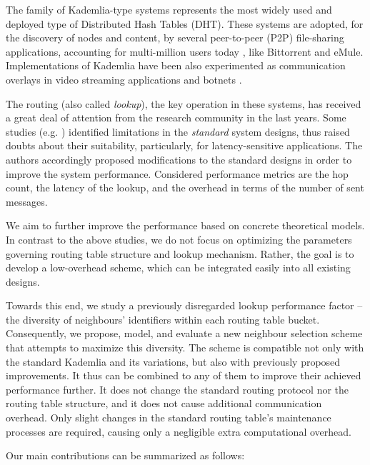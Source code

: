 \documentclass[10pt, conference, compsocconf, letterpaper]{IEEEtran}
\begin{document}
The family of Kademlia-type \cite{Maymounkov02Kademlia} systems represents the most widely used and deployed type of Distributed Hash Tables (DHT). These systems are adopted, for the discovery of nodes and content, by several peer-to-peer (P2P) file-sharing applications, accounting for multi-million users today \cite{wang2013measuring, salah13capturing}, like Bittorrent and eMule. Implementations of Kademlia have been also experimented as communication overlays in video streaming applications \cite{jimenez11kademlia} and botnets \cite{starnberger08overbot, holz08measurements}.

The routing (also called \emph{lookup}), the key operation in these systems, has received a great deal of attention from the research community in the last years. Some studies (e.g. \cite{li05comparing, stutzbach06improving, steiner10evaluating, falkner07profiling, crosby07analysis, Jimenez2011subsecond, roos13comprehending}) identified limitations in the \emph{standard} system designs, thus raised doubts about their suitability, particularly, for latency-sensitive applications. 
The authors accordingly proposed modifications to the standard designs in order to improve the system performance. 
Considered performance metrics are the hop count, the latency of the lookup, and the overhead in terms of the number of sent messages.

We aim to further improve the performance based on concrete theoretical models. 
In contrast to the above studies, we do not focus on optimizing the parameters governing routing table structure and lookup mechanism. Rather, the goal is to develop a low-overhead scheme, which can be integrated easily into all existing designs. 

Towards this end, we study a previously disregarded lookup performance factor -- the diversity of neighbours' identifiers within each routing table bucket. 
Consequently, we propose, model, and evaluate a new neighbour selection scheme that attempts to maximize this diversity. The scheme is  compatible not only with the standard Kademlia and its variations, but also with previously proposed improvements. It thus can be combined to any of them to improve their achieved performance further. It does not change the standard routing protocol nor the routing table structure, and it does not cause additional communication overhead. Only slight changes in the standard routing table's maintenance processes are required, causing only a negligible extra computational overhead. 

\vspace{3pt}
Our main contributions can be summarized as follows:
\end{document}
